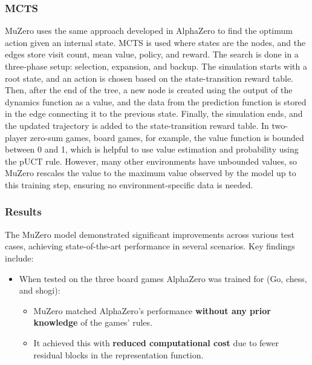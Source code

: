 \subsubsection{MCTS}
MuZero uses the same approach developed in AlphaZero to find the optimum action
given an internal state. MCTS is used where states are the nodes, and the edges
store visit count, mean value, policy, and reward. The search is done in a
three-phase setup: selection, expansion, and backup. The simulation starts with
a root state, and an action is chosen based on the state-transition reward
table. Then, after the end of the tree, a new node is created using the output
of the dynamics function as a value, and the data from the prediction function
is stored in the edge connecting it to the previous state. Finally, the
simulation ends, and the updated trajectory is added to the state-transition
reward table. In two-player zero-sum games, board games, for example, the value
function is bounded between 0 and 1, which is helpful to use value estimation
and probability using the pUCT rule. However, many other environments have
unbounded values, so MuZero rescales the value to the maximum value observed by
the model up to this training step, ensuring no environment-specific data is
needed.\cite{mz1}

\subsubsection{Results}
The MuZero model demonstrated significant improvements across various test
cases, achieving state-of-the-art performance in several scenarios. Key
findings include:

\begin{itemize}
    \item When tested on the three board games AlphaZero was trained for (Go, chess, and
          shogi):
          \begin{itemize}
              \item MuZero matched AlphaZero's performance \textbf{without any prior knowledge} of
                    the games' rules.
              \item It achieved this with \textbf{reduced computational cost} due to fewer residual
                    blocks in the representation function.
          \end{itemize}
\end{itemize}

